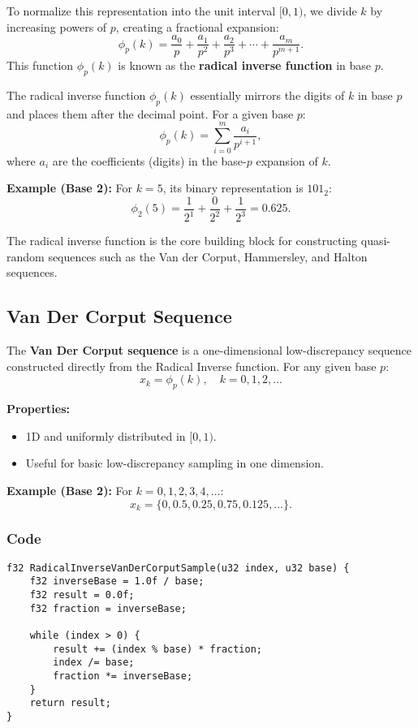 \documentclass{article}
\begin{document}
To normalize this representation into the unit interval $[0, 1)$, we divide $k$ by increasing powers of $p$, creating a fractional expansion:
\[
    \phi_p(k) = \frac{a_0}{p} + \frac{a_1}{p^2} + \frac{a_2}{p^3} + \cdots + \frac{a_m}{p^{m+1}}.
\]
This function $\phi_p(k)$ is known as the \textbf{radical inverse function} in base $p$.

The radical inverse function \( \phi_p(k) \) essentially mirrors the digits of $k$ in base $p$ and places them after the decimal point. For a given base $p$:
\[
    \phi_p(k) = \sum_{i=0}^m \frac{a_i}{p^{i+1}},
\]
where $a_i$ are the coefficients (digits) in the base-$p$ expansion of $k$.

\textbf{Example (Base 2):}
For \( k = 5 \), its binary representation is \( 101_2 \):
\[
    \phi_2(5) = \frac{1}{2^1} + \frac{0}{2^2} + \frac{1}{2^3} = 0.625.
\]

The radical inverse function is the core building block for constructing quasi-random sequences such as the Van der Corput, Hammersley, and Halton sequences.
\subsection{Van Der Corput Sequence}
The \textbf{Van Der Corput sequence} is a one-dimensional low-discrepancy sequence constructed directly from the Radical Inverse function. For any given base $p$:
\[
    x_k = \phi_p(k), \quad k = 0, 1, 2, \dots
\]

\textbf{Properties:}
\begin {itemize}
	\item 1D and uniformly distributed in \([0, 1)\).
	\item Useful for basic low-discrepancy sampling in one dimension.
\end{itemize}

\textbf{Example (Base 2):}
For \( k = 0, 1, 2, 3, 4, \dots \):
\[
    x_k = \{0, 0.5, 0.25, 0.75, 0.125, \dots\}.
\]

\subsubsection{Code}
\begin{lstlisting}[caption={Radical Inverse Function}]
f32 RadicalInverseVanDerCorputSample(u32 index, u32 base) {
    f32 inverseBase = 1.0f / base;
    f32 result = 0.0f;
    f32 fraction = inverseBase;

    while (index > 0) {
        result += (index % base) * fraction;
        index /= base;
        fraction *= inverseBase;
    }
    return result;
}
\end{lstlisting}
\end{document}
